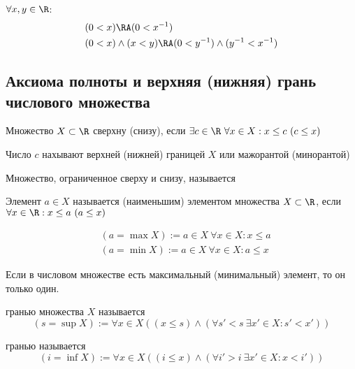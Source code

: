 \documentclass[a4paper, 14pt]{article}
\begin{document}
    \begin{theorem}
        $\forall x,y \in \R$:
        \begin{align*}
            &(0 < x) \RA (0 < x^{-1}) \\
            &(0 < x) \land (x < y) \RA (0 < y^{-1}) \land (y^{-1} < x^{-1})
        \end{align*}
    \end{theorem}

    \subsection{Аксиома полноты и верхняя (нижняя) грань числового множества}

    \begin{definition}
        Множество $X \subset \R$ { сверхну (снизу)}, если
        $\exists c \in \R \ \forall x \in X: x \leq c \ (c \leq x)$
    \end{definition}
    Число $c$ нахывают верхней (нижней) границей $X$ или мажорантой (минорантой)
    \begin{definition}
        Множество, ограниченное сверху и снизу, называется 
        {}
    \end{definition}
    \begin{definition}
        Элемент $a \in X$ называется { (наименьшим)} 
        элементом множества $X \subset \R$, если $\forall x \in \R: x \leq a \ (a \leq x)$

        \begin{align*}
            &(a = \max X) := a \in X \ \forall x \in X: x \leq a \\
            &(a = \min X) := a \in X \ \forall x \in X: a \leq x
        \end{align*}
    \end{definition}

    \begin{lemma}
        Если в числовом множестве есть максимальный (минимальный) элемент, то он только один.
    \end{lemma}
    \begin{definition}
        { гранью} множества $X$ называется 
        \[(s = \sup X) := \forall x \in X ((x \leq s) \land (\forall s' < s \ \exists x' \in X: s' < x'))\]
    \end{definition}
    \begin{definition}
        { гранью} называется
        \[(i = \inf X) := \forall x \in X((i \leq x) \land (\forall i' > i \ \exists x' \in X: x < i'))\]
    \end{definition}
\end{document}
